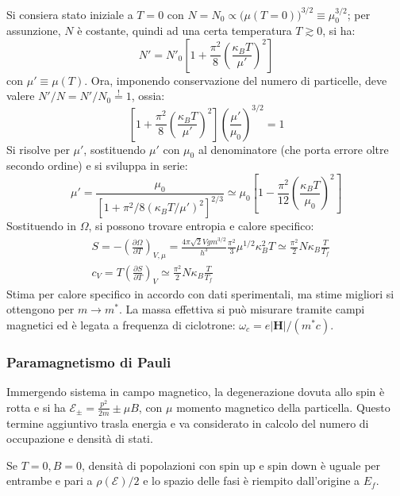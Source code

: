 \documentclass[10pt, a4paper]{scrartcl}
\numberwithin{equation}{subsection}
\theoremstyle{style1}
\theoremstyle{style2}
\begin{document}
Si consiera stato iniziale a $T=0$ con $N =  N_0 \propto \big(\mu (T=0)\big)^{ 3 / 2} \equiv \mu_0^{3 / 2} $; per assunzione, $N$ \`e costante, quindi ad una certa temperatura $T \gtrsim 0$, si ha:
\[
	N' = N'_0 \left[1 + \frac{\pi^2}{8} \left(\frac{\kappa _B T}{\mu' }\right)^2\right]
\] 
con $\mu ' \equiv \mu (T)$. Ora, imponendo conservazione del numero di particelle, deve valere $N' / N=N' / N_0 \stackrel{!}{=} 1$, ossia:
\[
\left[ 1+ \frac{\pi^2}{8}\left(\frac{\kappa _B T}{\mu '}\right) ^2 \right] \left(\frac{\mu '}{\mu_0 }\right) ^{3 / 2} =1
\] 
Si risolve per $\mu '$, sostituendo $\mu' $ con $\mu_0$ al denominatore (che porta errore oltre secondo ordine) e si sviluppa in serie:
\begin{equation}
\mu ' = \frac{\mu_0 }{\left[ 1 + \pi^2 / 8 (\kappa _B T / \mu ')^2 \right] ^{2 / 3} }\simeq \mu_0 \left[ 1 - \frac{\pi^2}{12} \left(\frac{\kappa _B T}{\mu_0 }\right) ^2 \right] 
\end{equation}
Sostituendo in $\Omega $, si possono trovare entropia e calore specifico:
\[
\begin{split}
	&S = -\left(\frac{\partial \Omega }{\partial T}\right)_{V,\mu }    = \frac{4 \pi \sqrt{2} V g m^{3 / 2} }{h^3}\frac{\pi^2 }{3}\mu ^{1 / 2} \kappa _B^2 T \simeq \frac{\pi^2}{2} N \kappa _B \frac{T}{T_f}\\
	&c_V = T \left(\frac{\partial S}{\partial T} \right) _V \simeq \frac{\pi^2}{ 2} N\kappa _B \frac{T}{T_f}
\end{split}
\] 
Stima per calore specifico in accordo con dati sperimentali, ma stime migliori si ottengono per $m\to m^*$. 
La massa effettiva si pu\`o misurare tramite campi magnetici ed \`e legata a frequenza di ciclotrone: $\omega_c = e \lvert \mathbf{H}  \rvert / (m^* c)$.

\subsubsection{Paramagnetismo di Pauli}

Immergendo sistema in campo magnetico, la degenerazione dovuta allo spin \`e rotta e si ha $\mathscr{E}_{\pm} = \frac{p^2}{2m} \pm \mu B$, con $\mu $ momento magnetico della particella.
Questo termine aggiuntivo trasla energia e va considerato in calcolo del numero di occupazione e densit\`a di stati.

Se $T= 0 , B=0$, densit\`a di popolazioni con spin up e spin down \`e uguale per entrambe e pari a $\rho (\mathscr{E}) / 2$ e lo spazio delle fasi \`e riempito dall'origine a $E_f$. 
\end{document}
